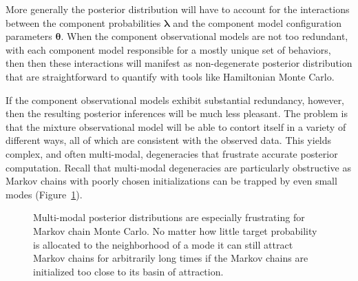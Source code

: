 \documentclass[
  letterpaper,
  DIV=11,
  numbers=noendperiod]{scrartcl}
\begin{document}
More generally the posterior distribution will have to account for the
interactions between the component probabilities
\(\boldsymbol{\lambda}\) and the component model configuration
parameters \(\boldsymbol{\theta}\). When the component observational
models are not too redundant, with each component model responsible for
a mostly unique set of behaviors, then then these interactions will
manifest as non-degenerate posterior distribution that are
straightforward to quantify with tools like Hamiltonian Monte Carlo.

If the component observational models exhibit substantial redundancy,
however, then the resulting posterior inferences will be much less
pleasant. The problem is that the mixture observational model will be
able to contort itself in a variety of different ways, all of which are
consistent with the observed data. This yields complex, and often
multi-modal, degeneracies that frustrate accurate posterior computation.
Recall that multi-modal degeneracies are particularly obstructive as
Markov chains with poorly chosen initializations can be trapped by even
small modes (Figure~\ref{fig-multimodal}).

\begin{figure}


\caption{\label{fig-multimodal}Multi-modal posterior distributions are
especially frustrating for Markov chain Monte Carlo. No matter how
little target probability is allocated to the neighborhood of a mode it
can still attract Markov chains for arbitrarily long times if the Markov
chains are initialized too close to its basin of attraction.}

\end{figure}%
\end{document}
